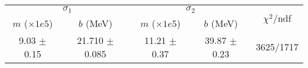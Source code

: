 \begin{tabular}{cc|cc||c}
\multicolumn{2}{c|}{$\sigma_1$} & \multicolumn{2}{|c}{$\sigma_2$} & \multirow{2}{*}{$\chi^2/$ndf} \\
$m$ ($\times1e5$) & $b$ (MeV) & $m$ ($\times1e5$) & $b$ (MeV) & \\
\hline
9.03 $\pm$ 0.15 & 21.710 $\pm$ 0.085 & 11.21 $\pm$ 0.37 & 39.87 $\pm$ 0.23 & 3625/1717\\
\end{tabular}
